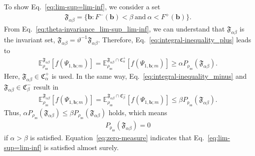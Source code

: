 \documentclass[preprint,pteplogo]{ptephy_v2}%
\numberwithin{equation}{section}
\theoremstyle{definition}
\begin{document}
To show Eq.~\eqref{eq:lim-sup=lim-inf}, we consider a set
\begin{align}
\mathfrak{F}_{\alpha\beta}=\{\bm{b} : F^-(\bm{b})<\beta\ \mathrm{and}\ \alpha<F^+(\bm{b})\}.
\end{align}
From Eq.~\eqref{eq:theta-invariance_lim-sup_lim-inf}, we can understand that $\mathfrak{F}_{\alpha\beta}$ is the invariant set, $\mathfrak{F}_{\alpha\beta}=\vartheta^{-1}\mathfrak{F}_{\alpha\beta}$. 
Therefore, Eq.~\eqref{eq:integral-inequality_plus} leads to
\begin{align}
\mathbb{E}_{\rho_\mathrm{ss}}^{\mathfrak{F}_{\alpha\beta}}\left[f(\Psi_{1,\bm{b};m})\right]
=\mathbb{E}_{\rho_\mathrm{ss}}^{\mathfrak{F}_{\alpha\beta} \cap \mathfrak{C}_\alpha^+}\left[f(\Psi_{1,\bm{b};m})\right]
\geq\alpha P_\mathrm{\rho_\mathrm{ss}}(\mathfrak{F}_{\alpha\beta}).
\end{align}
Here, $\mathfrak{F}_{\alpha\beta} \in \mathfrak{C}_\alpha^+$ is used.
In the same way, Eq.~\eqref{eq:integral-inequality_minus} and $\mathfrak{F}_{\alpha\beta} \in \mathfrak{C}_\beta^-$ result in
\begin{align}
\mathbb{E}_{\rho_\mathrm{ss}}^{\mathfrak{F}_{\alpha\beta}}\left[f(\Psi_{1,\bm{b};m})\right]
=\mathbb{E}_{\rho_\mathrm{ss}}^{\mathfrak{F}_{\alpha\beta} \cap \mathfrak{C}_\beta^-}\left[f(\Psi_{1,\bm{b};m})\right]
\leq\beta P_\mathrm{\rho_\mathrm{ss}}(\mathfrak{F}_{\alpha\beta}).
\end{align}
Thus, $\alpha P_{\rho_\mathrm{ss}}(\mathfrak{F}_{\alpha\beta})\leq\beta P_{\rho_\mathrm{ss}}(\mathfrak{F}_{\alpha\beta})$ holds, which means
\begin{align}
P_\mathrm{\rho_\mathrm{ss}}(\mathfrak{F}_{\alpha\beta})=0
\label{eq:zero-measure}
\end{align}
if $\alpha>\beta$ is satisfied. 
Equation~\eqref{eq:zero-measure} indicates that Eq.~\eqref{eq:lim-sup=lim-inf} is satisfied almost surely.
\end{document}
